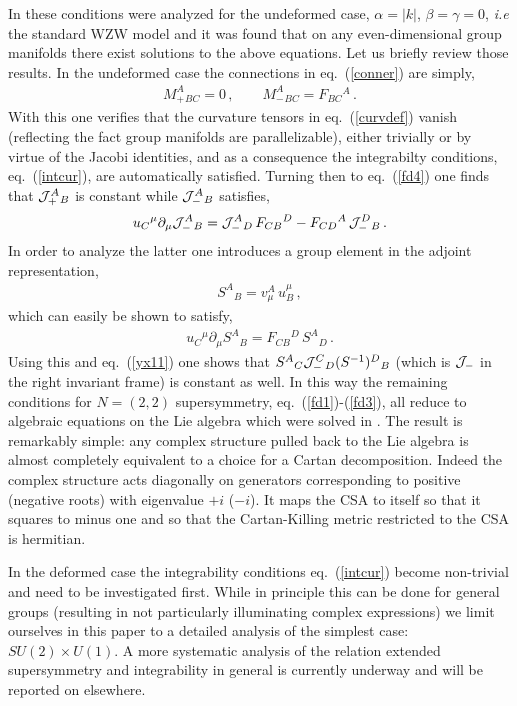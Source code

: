 \documentclass[12pt]{article}
\def\J{{\cal J}}
\begin{document}
In \cite{Spindel:1988nh,Spindel:1988sr} these conditions were analyzed for the undeformed case, $\alpha =|k|$, $\beta =\gamma =0$, {\em i.e} the standard WZW model and it was found that on any even-dimensional group manifolds there exist solutions to the above equations. Let us briefly review those results. In the undeformed case the connections in eq.~(\ref{conner}) are simply,
\begin{eqnarray}
M_+^A{}_{BC}=0\,,\qquad M_-^A{}_{BC}=F_{BC}{}^A\,.
\end{eqnarray} 
With this one verifies that the curvature tensors in eq.~(\ref{curvdef}) vanish (reflecting the fact group manifolds are parallelizable), either trivially or by virtue of the Jacobi identities, and as a consequence the integrabilty conditions, eq.~(\ref{intcur}), are automatically satisfied. Turning then to eq.~(\ref{fd4}) one finds that ${\cal J}_+^A{}_B$ is constant while ${\cal J}_-^A{}_B$ satisfies,
\begin{eqnarray}
u_C{}^{\mu}\partial_\mu \J_{-}^{A}{}_B =  \J_{-}^{A}{}_D\,F_{CB}{}^D - F_{CD}{}^A\,\J_{-}^{D}{}_B\,. \label{yx11}
\end{eqnarray}  
In order to analyze the latter one introduces a group element in the adjoint representation,
\begin{eqnarray}
S^A{}_B= v_\mu ^A\,u^\mu _B\,,
\end{eqnarray} 
which can easily be shown to satisfy,
\begin{eqnarray}
u_C{}^{\mu}\partial_\mu S^A{}_B=F_{CB}{}^D\,S^A{}_D\,.
\end{eqnarray} 
Using this and eq.~(\ref{yx11}) one  shows that $S^A{}_C{\cal J}_-^C{}_D(S^{-1} )^D{}_B$ (which is ${\cal J}_-$ in the right invariant frame) is constant as well. In this way the remaining conditions for $N=(2,2)$ supersymmetry, eq.~(\ref{fd1})-(\ref{fd3}), all reduce to algebraic equations on the Lie algebra which were solved in \cite{Spindel:1988nh,Spindel:1988sr}. The result is remarkably simple: any complex structure pulled back to the Lie algebra is almost completely equivalent to a choice for a Cartan decomposition. Indeed the complex structure acts diagonally on generators corresponding to positive (negative roots) with eigenvalue $+i$ ($-i$). It maps the CSA to itself so that it squares to minus one and so that the Cartan-Killing metric restricted to the CSA is hermitian. 


In the deformed case the integrability conditions eq.~(\ref{intcur}) become non-trivial and need to be  investigated first. While in principle this can be done for general groups (resulting in not particularly illuminating complex expressions) we limit ourselves in this paper to a detailed analysis of the simplest case: $SU(2)\times U(1)$.  A more systematic analysis of the relation extended supersymmetry and integrability in general is currently underway and will be reported on elsewhere. 
\end{document}

